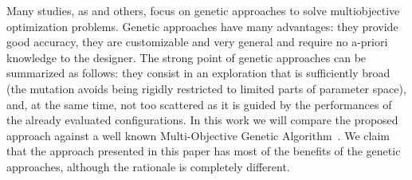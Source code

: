 Many studies, as \cite{coello_easmop} and others, focus on genetic approaches to solve multiobjective
optimization problems. Genetic approaches
have many advantages: they provide good accuracy, they are customizable and very general
and require no a-priori knowledge to the designer.  The strong
point of genetic approaches can be summarized as follows: they consist
in an exploration that is sufficiently broad (the mutation avoids being rigidly restricted to limited parts of parameter space), and, at the same time, not too scattered as it is guided by the performances of
the already evaluated configurations. In this work we will compare 
the proposed approach against a well known Multi-Objective Genetic
Algorithm~\cite{knowles_techrep06}.
We claim that the approach presented in this paper has most of the benefits of the genetic
approaches, although the rationale is completely different.
